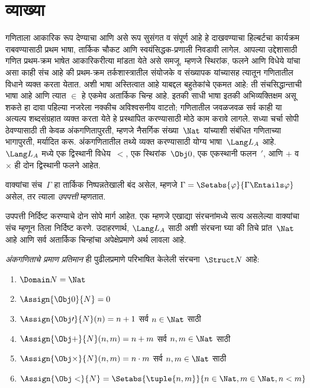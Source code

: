 \section{व्याख्या}\label{inc:int:def:sec}

गणिताला आकारिक रूप देण्याचा आणि असे रूप सुसंगत व संपूर्ण आहे हे
दाखवण्याचा हिल्बर्टचा कार्यक्रम राबवण्यासाठी प्रथम भाषा, तार्किक चौकट
आणि स्वयंसिद्धक-प्रणाली निवडावी लागेल. आपल्या उद्देशासाठी गणित प्रथम-क्रम
भाषेत आकारिकरीत्या मांडता येते असे समजू. म्हणजे स्थिरांक,
फलने आणि विधेये यांचा असा काही संच आहे की प्रथम-क्रम
तर्कशास्त्रातील संयोजके व संख्यापक यांच्यासह त्यातून गणितातील विधाने
व्यक्त करता येतात. अशी भाषा अस्तित्वात आहे याबद्दल बहुतेकांचे एकमत
आहे: ती संचसिद्धान्ताची भाषा आहे आणि त्यात $\in$ हे एकमेव अतार्किक
चिन्ह आहे. इतकी साधी भाषा इतकी अभिव्यक्तिक्षम असू शकते हा दावा
पहिल्या नजरेला नक्कीच अविश्वसनीय वाटतो; गणितातील जवळजवळ सर्व काही
या अत्यल्प शब्दसंग्रहात व्यक्त करता येते हे प्रस्थापित करण्यासाठी
मोठे काम करावे लागले. सध्या चर्चा सोपी ठेवण्यासाठी ती केवळ
अंकगणितापुरती, म्हणजे नैसर्गिक संख्या~$\Nat$ यांच्याशी संबंधित
गणिताच्या भागापुरती, मर्यादित करू. अंकगणितातील तथ्ये व्यक्त करण्यासाठी
योग्य भाषा~$\Lang L_A$ आहे. $\Lang L_A$ मध्ये एक द्विस्थानी
विधेय~$<$, एक स्थिरांक~$\Obj 0$, एक एकस्थानी
फलन~$\prime$, आणि $+$ व $\times$ ही दोन द्विस्थानी
फलने आहेत.

\begin{defn}
वाक्यांचा संच~$\Gamma$ हा तार्किक निष्पन्नतेखाली बंद असेल, म्हणजे
$\Gamma = \Setabs{\varphi}{\Gamma \Entails
\varphi}$ असेल, तर त्याला \emph{उपपत्ती} म्हणतात.
\end{defn}

उपपत्ती निर्दिष्ट करण्याचे दोन सोपे मार्ग आहेत. एक म्हणजे एखाद्या
संरचनांमध्ये सत्य असलेल्या वाक्यांचा संच म्हणून
तिला निर्दिष्ट करणे. उदाहरणार्थ, $\Lang L_A$ साठी अशी संरचना
घ्या की तिचे प्रांत~$\Nat$ आहे आणि सर्व अतार्किक चिन्हांचा
अपेक्षेप्रमाणे अर्थ लावला आहे.

\begin{defn}\label{inc:int:def:def:standard-model}
\emph{अंकगणिताचे प्रमाण प्रतिमान} ही पुढीलप्रमाणे परिभाषित
केलेली संरचना~$\Struct
N$ आहे:
\begin{enumerate}
\item $\Domain N = \Nat$
\item $\Assign{\Obj 0}{N} = 0$
\item $\Assign{\Obj \prime}{N}(n) = n + 1$ सर्व $n \in \Nat$ साठी
\item $\Assign{\Obj +}{N}(n, m) = n + m$ सर्व $n, m \in \Nat$ साठी
\item $\Assign{\Obj \times}{N}(n, m) = n\cdot m$ सर्व $n, m \in \Nat$ साठी
\item $\Assign{\Obj <}{N} = \Setabs{\tuple{n, m}}{n \in \Nat, m \in
  \Nat, n < m}$
\end{enumerate}
\end{defn}

